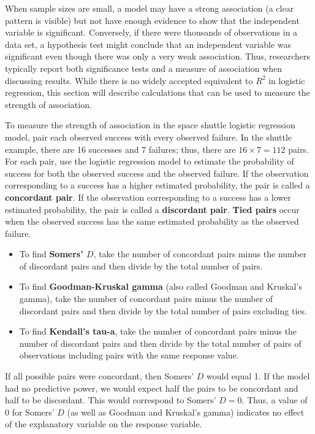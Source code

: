 \documentclass[
]{book}
\begin{document}
When sample sizes are small, a model may have a strong association (a clear pattern is visible) but not have enough evidence to show that the independent variable is significant. Conversely, if there were thousands of observations in a data set, a hypothesis test might conclude that an independent variable was significant even though there was only a very weak association. Thus, researchers typically report both significance tests and a measure of association when discussing results. While there is no widely accepted equivalent to \(R^2\) in logistic regression, this section will describe calculations that can be used to measure the strength of association.

To measure the strength of association in the space shuttle logistic regression model, pair each observed success with every observed failure. In the shuttle example, there are 16 successes and 7 failures; thus, there are \(16 \times 7 = 112\) pairs. For each pair, use the logistic regression model to estimate the probability of success for both the observed success and the observed failure. If the observation corresponding to a success has a higher estimated probability, the pair is called a \textbf{concordant pair}. If the observation corresponding to a success has a lower estimated probability, the pair is called a \textbf{discordant pair}. \textbf{Tied pairs} occur when the observed success has the same estimated probability as the observed failure.

\begin{itemize}
  \item To find \textbf{Somers’ $D$}, take the number of concordant pairs minus the number of discordant pairs and then divide by the total number of pairs.
  \item To find \textbf{Goodman-Kruskal gamma} (also called Goodman and Kruskal’s gamma), take the number of concordant pairs minus the number of discordant pairs and then divide by the total number of pairs excluding ties.
  \item To find \textbf{Kendall’s tau-a}, take the number of concordant pairs minus the number of discordant pairs and then divide by the total number of pairs of observations including pairs with the same response value.
\end{itemize}

If all possible pairs were concordant, then Somers' \(D\) would equal 1. If the model had no predictive power, we would expect half the pairs to be concordant and half to be discordant. This would correspond to Somers' \(D = 0\). Thus, a value of 0 for Somers' \(D\) (as well as Goodman and Kruskal's gamma) indicates no effect of the explanatory variable on the response variable.
\end{document}
